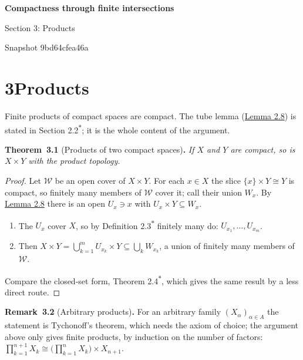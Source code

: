 \documentclass[11pt]{article}
\newenvironment{bpstatement}[2]{\par\addvspace{0.6\baselineskip}\noindent\textbf{#1}#2\textbf{.}\enspace\ignorespaces}
  {\par\addvspace{0.4\baselineskip}}
\newenvironment{bpstatementit}[2]{\begin{bpstatement}{#1}{#2}\itshape\ignorespaces}{\end{bpstatement}}
\newcommand{\bpout}[1]{#1\textsuperscript{\hyperlink{bp-outside}{\ensuremath{\ast}}}}
\providecommand{\fam}{}\renewcommand{\fam}[1]{\mathcal{#1}}
\begin{document}
\pagestyle{plain}
\begin{center}
{\LARGE\bfseries Compactness through finite intersections\par}
\vspace{0.7em}
{\large Section 3: Products\par}
\vspace{0.5em}
{\small\color{bpmuted}Snapshot 9bd64cfea46a\par}
\end{center}
\bigskip

\section*{\texorpdfstring{3\quad Products}{3 Products}}
\label{bp1}%
Finite products of compact spaces are compact.  The tube lemma (\hyperref[bp4]{Lemma 2.8}) is stated in Section \bpout{2.2}; it is the whole content of the argument.
\label{bp2}%
\begin{bpstatementit}{Theorem~3.1}{ (Products of two compact spaces)}
If \(X\) and \(Y\) are compact, so is \(X \times Y\) with the product topology.

\begin{proof}[{Proof}]
Let \(\fam{W}\) be an open cover of \(X \times Y\).  For each \(x \in X\) the slice \(\{x\} \times Y \cong Y\) is compact, so finitely many members of \(\fam{W}\) cover it; call their union \(W_x\).  By \hyperref[bp4]{Lemma 2.8} there is an open \(U_x \ni x\) with \(U_x \times Y \subseteq W_x\).

\begin{enumerate}
\item The \(U_x\) cover \(X\), so by \bpout{Definition 2.3} finitely many do: \(U_{x_1}, \dots, U_{x_m}\).
\item Then \(X \times Y = \bigcup_{k=1}^{m} U_{x_k} \times Y \subseteq \bigcup_k W_{x_k}\), a union of finitely many members of \(\fam{W}\).
\end{enumerate}

Compare the closed-set form, \bpout{Theorem 2.4}, which gives the same result by a less direct route.
\end{proof}
\end{bpstatementit}

\label{bp3}%
\begin{bpstatement}{Remark~3.2}{ (Arbitrary products)}
For an arbitrary family \((X_\alpha)_{\alpha \in A}\) the statement is Tychonoff's theorem, which needs the axiom of choice; the argument above only gives finite products, by induction on the number of factors: \(\prod_{k=1}^{n+1} X_k \cong \bigl(\prod_{k=1}^{n} X_k\bigr) \times X_{n+1}\).
\end{bpstatement}
\end{document}
